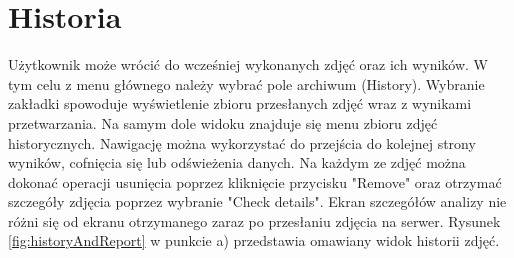 \section{Historia}{
Użytkownik może wrócić do wcześniej wykonanych zdjęć oraz ich wyników. W tym celu z menu głównego należy wybrać pole archiwum (History). Wybranie zakładki spowoduje wyświetlenie zbioru przesłanych zdjęć wraz z wynikami przetwarzania. Na samym dole widoku znajduje się menu zbioru zdjęć historycznych. Nawigację można wykorzystać do przejścia do kolejnej strony wyników, cofnięcia się lub odświeżenia danych. Na każdym ze zdjęć można dokonać operacji usunięcia poprzez kliknięcie przycisku "Remove" oraz otrzymać szczegóły zdjęcia poprzez wybranie "Check details". Ekran szczegółów analizy nie różni się od ekranu otrzymanego zaraz po przesłaniu zdjęcia na serwer. Rysunek \ref{fig:historyAndReport} w punkcie a) przedstawia omawiany widok historii zdjęć.
}
